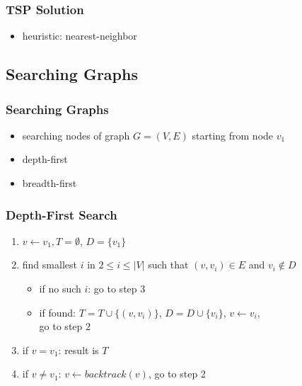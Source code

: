 \documentclass[dvipsnames]{beamer}
\begin{document}
\begin{frame}
  \frametitle{TSP Solution}

  \begin{itemize}
    \item heuristic: nearest-neighbor
  \end{itemize}
\end{frame}


\subsection{Searching Graphs}

\begin{frame}
  \frametitle{Searching Graphs}

  \begin{itemize}
    \item searching nodes of graph $G=(V,E)$ starting from node $v_1$

    \bigskip
    \item depth-first
    \item breadth-first
  \end{itemize}
\end{frame}

\begin{frame}
  \frametitle{Depth-First Search}

  \begin{enumerate}
    \item $v \leftarrow v_1, T=\emptyset$, $D=\{v_1\}$

    \pause
    \smallskip
    \item find smallest $i$ in $2 \leq i \leq |V|$
      such that $(v,v_i) \in E$ and $v_i \notin D$
    \begin{itemize}
      \item if no such $i$: go to step 3
      \item if found: $T=T \cup \{(v,v_i)\}$, $D=D \cup \{v_i\}$,
        $v \leftarrow v_i$,\\
        go to step 2
    \end{itemize}

    \pause
    \smallskip
    \item if $v=v_1$: result is $T$

    \pause
    \smallskip
    \item if $v \neq v_1$: $v \leftarrow backtrack(v)$, go to step 2
  \end{enumerate}
\end{frame}
\end{document}
